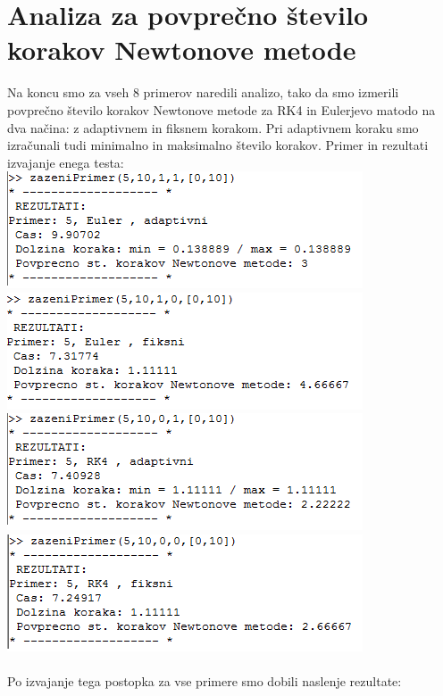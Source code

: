 \documentclass[12pt]{article}
\begin{document}
\section{Analiza za povpre\v{c}no \v{s}tevilo korakov Newtonove metode} 
Na koncu smo za vseh 8 primerov naredili analizo, tako da smo izmerili povpre\v{c}no \v{s}tevilo korakov Newtonove metode za RK4 in Eulerjevo matodo na dva na\v{c}ina: z adaptivnem in fiksnem korakom. Pri adaptivnem koraku smo izra\v{c}unali tudi minimalno in maksimalno \v{s}tevilo korakov. \newline
Primer in rezultati izvajanje enega testa: \\
	\includegraphics[scale=0.8]{a1}
	\includegraphics[scale=0.8]{a2}
	\includegraphics[scale=0.8]{a3}
	\includegraphics[scale=0.8]{a4} \\ \\
Po izvajanje tega postopka za vse primere smo dobili naslenje rezultate: \\
\end{document}
